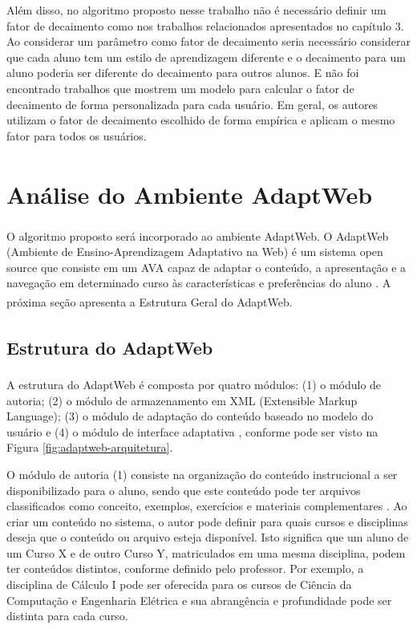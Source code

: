 Além disso, no algoritmo proposto nesse trabalho não é necessário definir um fator de decaimento como nos trabalhos
relacionados apresentados no capítulo 3. Ao considerar um parâmetro como fator de decaimento seria necessário considerar
que cada aluno tem um estilo de aprendizagem diferente e o decaimento para um aluno poderia ser diferente do decaimento
para outros alunos. E não foi encontrado trabalhos que mostrem um modelo para calcular o fator de decaimento de forma
personalizada para cada usuário. Em geral, os autores utilizam o fator de decaimento escolhido de forma empírica e
aplicam o mesmo fator para todos os usuários.

\section{Análise do Ambiente AdaptWeb\textsuperscript{\textregistered}}

O algoritmo proposto será incorporado ao ambiente AdaptWeb\textsuperscript{\textregistered}. O
AdaptWeb\textsuperscript{\textregistered} (Ambiente de Ensino-Aprendizagem Adaptativo na Web) é um sistema open source
que consiste em um AVA capaz de adaptar o conteúdo, a apresentação e a navegação em determinado curso às características
e preferências do aluno \cite{gasparini2009adaptweb}. A próxima seção apresenta a Estrutura Geral do
AdaptWeb\textsuperscript{\textregistered}.

\subsection{Estrutura do AdaptWeb\textsuperscript{\textregistered}}

A estrutura do AdaptWeb\textsuperscript{\textregistered} é composta por quatro módulos: (1) o módulo de autoria; (2) o
módulo de armazenamento em XML (Extensible Markup Language); (3) o módulo de adaptação do conteúdo baseado no modelo do
usuário e (4) o módulo de interface adaptativa \cite{gasparini2003interface}, conforme pode ser visto na Figura
\ref{fig:adaptweb-arquitetura}.

O módulo de autoria (1) consiste na organização do conteúdo instrucional a ser disponibilizado para o aluno, sendo que
este conteúdo pode ter arquivos classificados como conceito, exemplos, exercícios e materiais complementares
\cite{gasparini2003interface}. Ao criar um conteúdo no sistema, o autor pode definir para quais cursos e disciplinas
deseja que o conteúdo ou arquivo esteja disponível. Isto significa que um aluno de um Curso X e de outro Curso Y,
matriculados em uma mesma disciplina, podem ter conteúdos distintos, conforme definido pelo professor. Por exemplo, a
disciplina de Cálculo I pode ser oferecida para os cursos de Ciência da Computação e Engenharia Elétrica e sua
abrangência e profundidade pode ser distinta para cada curso.

